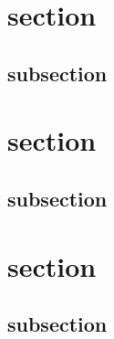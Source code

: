 \documentclass{article}
\begin{document}

\newpage
\tableofcontents
\newpage


\section{section}
\subsection{subsection}

\section{section}
\subsection{subsection}

\section{section}
\subsection{subsection}
\end{document}
